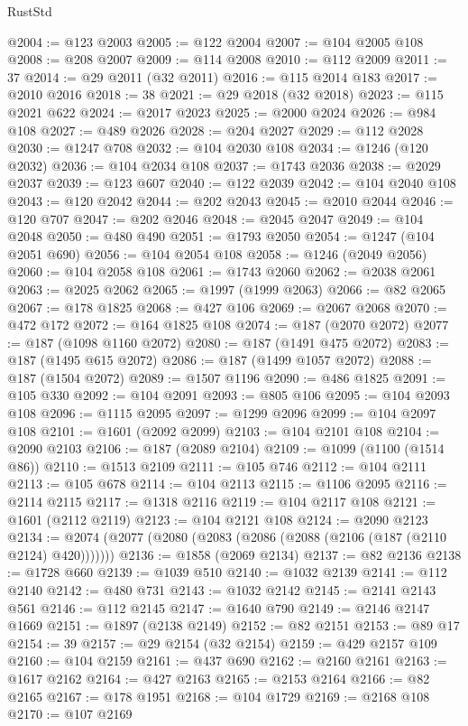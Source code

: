 \begin{lexlean}{RustStd}
\begin{coremodule}
@2004 := @123 @2003
@2005 := @122 @2004
@2007 := @104 @2005 @108
@2008 := @208 @2007
@2009 := @114 @2008
@2010 := @112 @2009
@2011 := 37
@2014 := @29 @2011 (@32 @2011)
@2016 := @115 @2014 @183
@2017 := @2010 @2016
@2018 := 38
@2021 := @29 @2018 (@32 @2018)
@2023 := @115 @2021 @622
@2024 := @2017 @2023
@2025 := @2000 @2024
@2026 := @984 @108
@2027 := @489 @2026
@2028 := @204 @2027
@2029 := @112 @2028
@2030 := @1247 @708
@2032 := @104 @2030 @108
@2034 := @1246 (@120 @2032)
@2036 := @104 @2034 @108
@2037 := @1743 @2036
@2038 := @2029 @2037
@2039 := @123 @607
@2040 := @122 @2039
@2042 := @104 @2040 @108
@2043 := @120 @2042
@2044 := @202 @2043
@2045 := @2010 @2044
@2046 := @120 @707
@2047 := @202 @2046
@2048 := @2045 @2047
@2049 := @104 @2048
@2050 := @480 @490
@2051 := @1793 @2050
@2054 := @1247 (@104 @2051 @690)
@2056 := @104 @2054 @108
@2058 := @1246 (@2049 @2056)
@2060 := @104 @2058 @108
@2061 := @1743 @2060
@2062 := @2038 @2061
@2063 := @2025 @2062
@2065 := @1997 (@1999 @2063)
@2066 := @82 @2065
@2067 := @178 @1825
@2068 := @427 @106
@2069 := @2067 @2068
@2070 := @472 @172
@2072 := @164 @1825 @108
@2074 := @187 (@2070 @2072)
@2077 := @187 (@1098 @1160 @2072)
@2080 := @187 (@1491 @475 @2072)
@2083 := @187 (@1495 @615 @2072)
@2086 := @187 (@1499 @1057 @2072)
@2088 := @187 (@1504 @2072)
@2089 := @1507 @1196
@2090 := @486 @1825
@2091 := @105 @330
@2092 := @104 @2091
@2093 := @805 @106
@2095 := @104 @2093 @108
@2096 := @1115 @2095
@2097 := @1299 @2096
@2099 := @104 @2097 @108
@2101 := @1601 (@2092 @2099)
@2103 := @104 @2101 @108
@2104 := @2090 @2103
@2106 := @187 (@2089 @2104)
@2109 := @1099 (@1100 (@1514 @86))
@2110 := @1513 @2109
@2111 := @105 @746
@2112 := @104 @2111
@2113 := @105 @678
@2114 := @104 @2113
@2115 := @1106 @2095
@2116 := @2114 @2115
@2117 := @1318 @2116
@2119 := @104 @2117 @108
@2121 := @1601 (@2112 @2119)
@2123 := @104 @2121 @108
@2124 := @2090 @2123
@2134 := @2074 (@2077 (@2080 (@2083 (@2086 (@2088 (@2106 (@187 (@2110 @2124) @420)))))))
@2136 := @1858 (@2069 @2134)
@2137 := @82 @2136
@2138 := @1728 @660
@2139 := @1039 @510
@2140 := @1032 @2139
@2141 := @112 @2140
@2142 := @480 @731
@2143 := @1032 @2142
@2145 := @2141 @2143 @561
@2146 := @112 @2145
@2147 := @1640 @790
@2149 := @2146 @2147 @1669
@2151 := @1897 (@2138 @2149)
@2152 := @82 @2151
@2153 := @89 @17
@2154 := 39
@2157 := @29 @2154 (@32 @2154)
@2159 := @429 @2157 @109
@2160 := @104 @2159
@2161 := @437 @690
@2162 := @2160 @2161
@2163 := @1617 @2162
@2164 := @427 @2163
@2165 := @2153 @2164
@2166 := @82 @2165
@2167 := @178 @1951
@2168 := @104 @1729
@2169 := @2168 @108
@2170 := @107 @2169

\end{coremodule}
\end{lexlean}
